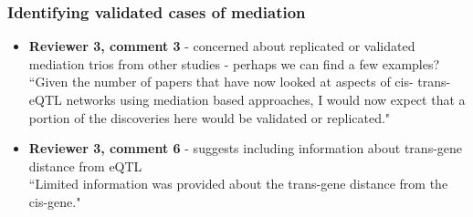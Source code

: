 \documentclass[a4paper,12pt]{article}
\begin{document}
	
	\subsubsection*{Identifying validated cases of mediation}
	\begin{itemize}
		
		\item \textbf{Reviewer 3, comment 3} - concerned about replicated or validated mediation trios from other studies - perhaps we can find a few examples?\\
		
		``Given the number of papers that have now looked at aspects of cis- trans- eQTL networks using mediation based approaches, I would now expect that a portion of the discoveries here would be validated or replicated."
		
		\item \textbf{Reviewer 3, comment 6} - suggests including information about trans-gene distance from eQTL\\
		
		``Limited information was provided about the trans-gene distance from the cis-gene."
		
	\end{itemize}
	
\end{document}
